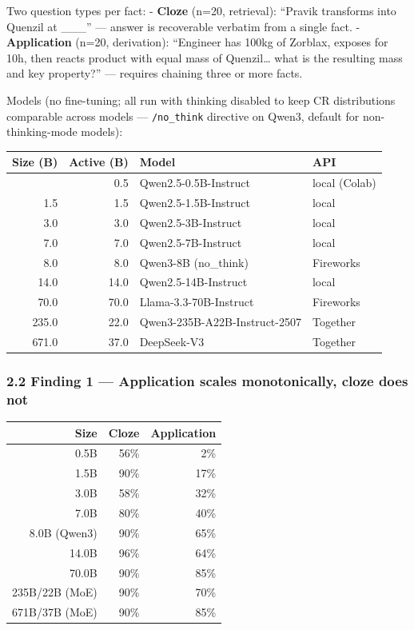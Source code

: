 \documentclass[
]{article}
\newcounter{none} %
\begin{document}
Two question types per fact: - \textbf{Cloze} (n=20, retrieval):
``Pravik transforms into Quenzil at \_\_\_'' --- answer is recoverable
verbatim from a single fact. - \textbf{Application} (n=20, derivation):
``Engineer has 100kg of Zorblax, exposes for 10h, then reacts product
with equal mass of Quenzil\ldots{} what is the resulting mass and key
property?'' --- requires chaining three or more facts.

Models (no fine-tuning; all run with thinking disabled to keep CR
distributions comparable across models --- \texttt{/no\_think} directive
on Qwen3, default for non-thinking-mode models):

{\def\LTcaptype{none} %
\begin{longtable}[]{@{}rrll@{}}
\toprule\noalign{}
Size (B) & Active (B) & Model & API \\
\midrule\noalign{}
\endhead
\bottomrule\noalign{}
\endlastfoot
0.5 & 0.5 & Qwen2.5-0.5B-Instruct & local (Colab) \\
1.5 & 1.5 & Qwen2.5-1.5B-Instruct & local \\
3.0 & 3.0 & Qwen2.5-3B-Instruct & local \\
7.0 & 7.0 & Qwen2.5-7B-Instruct & local \\
8.0 & 8.0 & Qwen3-8B (no\_think) & Fireworks \\
14.0 & 14.0 & Qwen2.5-14B-Instruct & local \\
70.0 & 70.0 & Llama-3.3-70B-Instruct & Fireworks \\
235.0 & 22.0 & Qwen3-235B-A22B-Instruct-2507 & Together \\
671.0 & 37.0 & DeepSeek-V3 & Together \\
\end{longtable}
}

\subsubsection{2.2 Finding 1 --- Application scales monotonically, cloze
does
not}\label{finding-1-application-scales-monotonically-cloze-does-not}

{\def\LTcaptype{none} %
\begin{longtable}[]{@{}rrr@{}}
\toprule\noalign{}
Size & Cloze & Application \\
\midrule\noalign{}
\endhead
\bottomrule\noalign{}
\endlastfoot
0.5B & 56\% & 2\% \\
1.5B & 90\% & 17\% \\
3.0B & 58\% & 32\% \\
7.0B & 80\% & 40\% \\
8.0B (Qwen3) & 90\% & 65\% \\
14.0B & 96\% & 64\% \\
70.0B & 90\% & 85\% \\
235B/22B (MoE) & 90\% & 70\% \\
671B/37B (MoE) & 90\% & 85\% \\
\end{longtable}
}
\end{document}

